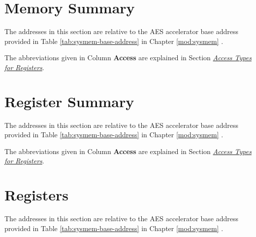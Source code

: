 \documentclass[main\_\_EN.tex]{subfiles}
\begin{document}
\section{Memory Summary}\label{aesMemorySummary}

The addresses in this section are relative to the AES accelerator base address provided in Table \ref{tab:sysmem-base-address} in Chapter \ref{mod:sysmem} \textit{}.

The abbreviations given in Column \textbf{Access} are explained in Section \hyperref[glossary-access-types]{\textit{Access Types for Registers}}.



\clearpage

\hypertarget{aes-reg-summ}{}
\section{Register Summary}

The addresses in this section are relative to the AES accelerator base address provided in Table \ref{tab:sysmem-base-address} in Chapter \ref{mod:sysmem} \textit{}.

The abbreviations given in Column \textbf{Access} are explained in Section \hyperref[glossary-access-types]{\textit{Access Types for Registers}}.


\clearpage
\section{Registers}
The addresses in this section are relative to the AES accelerator base address provided in Table \ref{tab:sysmem-base-address} in Chapter \ref{mod:sysmem} \textit{}.


\end{document}
